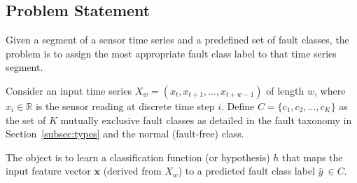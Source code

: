 
\subsection{Problem Statement}
Given a segment of a sensor time series and a predefined set of fault classes, the problem is to assign the most appropriate fault class label to that time series segment.

Consider an input time series \(X_w = (x_t, x_{t+1}, \ldots, x_{t+w-1})\) of length \(w\), where \(x_i \in \mathbb{R}\) is the sensor reading at discrete time step \(i\). Define \(C = \{c_1, c_2, \ldots, c_K\}\) as the set of \(K\) mutually exclusive fault classes as detailed in the fault taxonomy in Section~\ref{subsec:types} and the normal (fault-free) class.

The object is to learn a classification function (or hypothesis) \(h\) that maps the input feature vector \(\mathbf{x}\) (derived from \(X_w\)) to a predicted fault class label \(\hat{y}\ \in C\).
